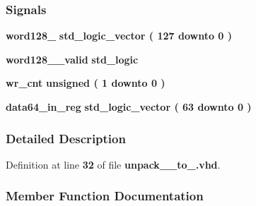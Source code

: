 \subsubsection*{Signals}
 \begin{DoxyCompactItemize}
\item 
{\bf word128\+\_} {\bfseries \textcolor{comment}{std\+\_\+logic\+\_\+vector}\textcolor{vhdlchar}{ }\textcolor{vhdlchar}{(}\textcolor{vhdlchar}{ }\textcolor{vhdlchar}{ } \textcolor{vhdldigit}{127} \textcolor{vhdlchar}{ }\textcolor{keywordflow}{downto}\textcolor{vhdlchar}{ }\textcolor{vhdlchar}{ } \textcolor{vhdldigit}{0} \textcolor{vhdlchar}{ }\textcolor{vhdlchar}{)}\textcolor{vhdlchar}{ }} 
\item 
{\bf word128\+\_\+\_\+valid} {\bfseries \textcolor{comment}{std\+\_\+logic}\textcolor{vhdlchar}{ }} 
\item 
{\bf wr\+\_\+cnt} {\bfseries \textcolor{comment}{unsigned}\textcolor{vhdlchar}{ }\textcolor{vhdlchar}{(}\textcolor{vhdlchar}{ }\textcolor{vhdlchar}{ } \textcolor{vhdldigit}{1} \textcolor{vhdlchar}{ }\textcolor{keywordflow}{downto}\textcolor{vhdlchar}{ }\textcolor{vhdlchar}{ } \textcolor{vhdldigit}{0} \textcolor{vhdlchar}{ }\textcolor{vhdlchar}{)}\textcolor{vhdlchar}{ }} 
\item 
{\bf data64\+\_\+in\+\_\+reg} {\bfseries \textcolor{comment}{std\+\_\+logic\+\_\+vector}\textcolor{vhdlchar}{ }\textcolor{vhdlchar}{(}\textcolor{vhdlchar}{ }\textcolor{vhdlchar}{ } \textcolor{vhdldigit}{63} \textcolor{vhdlchar}{ }\textcolor{keywordflow}{downto}\textcolor{vhdlchar}{ }\textcolor{vhdlchar}{ } \textcolor{vhdldigit}{0} \textcolor{vhdlchar}{ }\textcolor{vhdlchar}{)}\textcolor{vhdlchar}{ }} 
\end{DoxyCompactItemize}


\subsubsection{Detailed Description}


Definition at line {\bf 32} of file {\bf unpack\+\_\+\_\+to\+\_.\+vhd}.



\subsubsection{Member Function Documentation}
